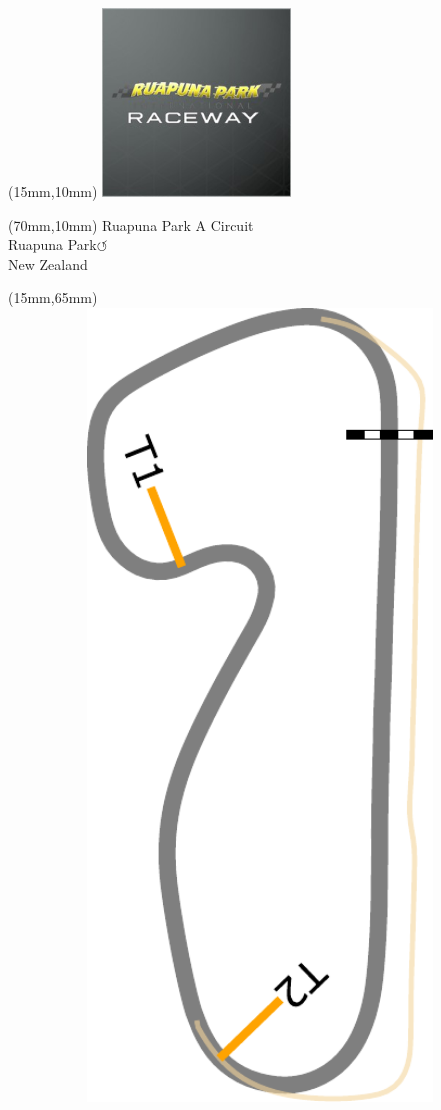 \null\newpage
\begin{textblock*}{50mm}(15mm,10mm)%
\includegraphics[width=50mm]{LG/RUPU.png}
\end{textblock*}
\begin{textblock*}{130mm}(70mm,10mm)%
{\fontsize{20}{20}\selectfont Ruapuna Park A Circuit\\}
{\fontsize{16}{16}\selectfont Ruapuna Park\hfill \huge$\circlearrowleft$\\}
{\fontsize{12}{12}\selectfont New Zealand\\}
\end{textblock*}
\begin{textblock*}{185mm}(15mm,65mm)%
\centering
\mbox{\includegraphics[width=185mm,height=210mm,keepaspectratio]{PT/RPAC.pdf}}
\end{textblock*}
